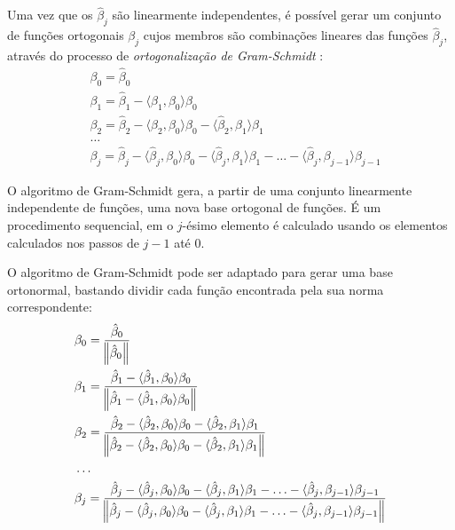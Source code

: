 Uma vez que os $\hat{\beta}_j$ são linearmente independentes, é possível gerar um conjunto de funções ortogonais $\beta_j$ cujos membros são combinações lineares das funções $\hat{\beta}_j$, através do processo de \textit{ortogonalização de Gram-Schmidt} \citep{livro_axler}:
\begin{align}
& \beta_0 = \hat{\beta}_0 \\
& \beta_1
=
\hat{\beta}_1 - \langle \hat{\beta}_1, \beta_0\rangle\beta_0 \\
& \beta_2
=
\hat{\beta}_2 - \langle \hat{\beta}_2, \beta_0\rangle\beta_0 - \langle \hat{\beta}_2, \beta_1\rangle\beta_1\\
& \ldots \nonumber \\
& \beta_j
=
\hat{\beta}_j - \langle \hat{\beta}_j, \beta_0\rangle\beta_0 - \langle \hat{\beta}_j, \beta_1\rangle\beta_1 - \ldots - \langle \hat{\beta}_j, \beta_{j - 1}\rangle\beta_{j - 1}
\end{align}

O algoritmo de Gram-Schmidt gera, a partir de uma conjunto linearmente independente de funções, uma nova base ortogonal de funções. É um procedimento sequencial, em o $j$-ésimo elemento é calculado usando os elementos calculados nos passos de $j-1$ até $0$.

O algoritmo de Gram-Schmidt pode ser adaptado para gerar uma base ortonormal, bastando dividir cada função encontrada pela sua norma correspondente:
\begin{align}
& \beta_0 = \frac{\hat{\beta}_0}{\norm{\hat{\beta}_0}} \label{gram_schmidt_01} \\
& \beta_1
=
\frac{\hat{\beta}_1 - \langle \hat{\beta}_1, \beta_0\rangle\beta_0}
{\norm{\hat{\beta}_1 - \langle \hat{\beta}_1, \beta_0\rangle\beta_0}}\label{gram_schmidt_02} \\
& \beta_2
=
\frac{\hat{\beta}_2 - \langle \hat{\beta}_2, \beta_0\rangle\beta_0 - \langle \hat{\beta}_2, \beta_1\rangle\beta_1}
{\norm{\hat{\beta}_2 - \langle \hat{\beta}_2, \beta_0\rangle\beta_0 - \langle \hat{\beta}_2, \beta_1\rangle\beta_1}} \label{gram_schmidt_03} \\
& \ldots \nonumber \\
& \beta_j
=
\frac{\hat{\beta}_j - \langle \hat{\beta}_j, \beta_0\rangle\beta_0 - \langle \hat{\beta}_j, \beta_1\rangle\beta_1 - \ldots - \langle \hat{\beta}_j, \beta_{j - 1}\rangle\beta_{j - 1} }
{\norm{\hat{\beta}_j - \langle \hat{\beta}_j, \beta_0\rangle\beta_0 - \langle \hat{\beta}_j, \beta_1\rangle\beta_1 - \ldots - \langle \hat{\beta}_j, \beta_{j - 1}\rangle\beta_{j - 1} }} \label{gram_schmidt_04}
\end{align}

